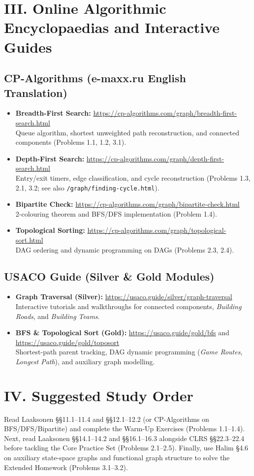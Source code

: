 \documentclass[11pt]{article}
\begin{document}
\section*{III. Online Algorithmic Encyclopaedias and Interactive Guides}

\subsection*{CP-Algorithms (e-maxx.ru English Translation)}
\begin{itemize}
    \item \textbf{Breadth-First Search:} \url{https://cp-algorithms.com/graph/breadth-first-search.html}\\
    Queue algorithm, shortest unweighted path reconstruction, and connected components (Problems 1.1, 1.2, 3.1).
    \item \textbf{Depth-First Search:} \url{https://cp-algorithms.com/graph/depth-first-search.html}\\
    Entry/exit timers, edge classification, and cycle reconstruction (Problems 1.3, 2.1, 3.2; see also \texttt{/graph/finding-cycle.html}).
    \item \textbf{Bipartite Check:} \url{https://cp-algorithms.com/graph/bipartite-check.html}\\
    2-colouring theorem and BFS/DFS implementation (Problem 1.4).
    \item \textbf{Topological Sorting:} \url{https://cp-algorithms.com/graph/topological-sort.html}\\
    DAG ordering and dynamic programming on DAGs (Problems 2.3, 2.4).
\end{itemize}

\subsection*{USACO Guide (Silver \& Gold Modules)}
\begin{itemize}
    \item \textbf{Graph Traversal (Silver):} \url{https://usaco.guide/silver/graph-traversal}\\
    Interactive tutorials and walkthroughs for connected components, \emph{Building Roads}, and \emph{Building Teams}.
    \item \textbf{BFS \& Topological Sort (Gold):} \url{https://usaco.guide/gold/bfs} and \url{https://usaco.guide/gold/toposort}\\
    Shortest-path parent tracking, DAG dynamic programming (\emph{Game Routes}, \emph{Longest Path}), and auxiliary graph modelling.
\end{itemize}

\section*{IV. Suggested Study Order}
Read Laaksonen \S\S 11.1--11.4 and \S\S 12.1--12.2 (or CP-Algorithms on BFS/DFS/Bipartite) and complete the Warm-Up Exercises (Problems 1.1--1.4). Next, read Laaksonen \S\S 14.1--14.2 and \S\S 16.1--16.3 alongside CLRS \S\S 22.3--22.4 before tackling the Core Practice Set (Problems 2.1--2.5). Finally, use Halim \S 4.6 on auxiliary state-space graphs and functional graph structure to solve the Extended Homework (Problems 3.1--3.2).
\end{document}
